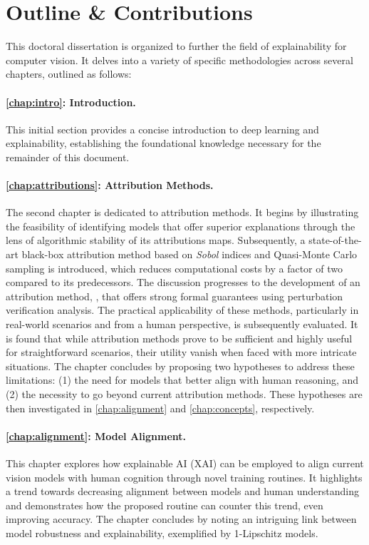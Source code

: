 \section{Outline \& Contributions}
\label{sec:intro:contrib}

This doctoral dissertation is organized to further the field of explainability for computer vision. It delves into a variety of specific methodologies across several chapters, outlined as follows:

\paragraph{\autoref{chap:intro}: Introduction.} This initial section provides a concise introduction to deep learning and explainability, establishing the foundational knowledge necessary for the remainder of this document.

\paragraph{\autoref{chap:attributions}: Attribution Methods.} The second chapter is dedicated to attribution methods. It begins by illustrating the feasibility of identifying models that offer superior explanations through the lens of algorithmic stability of its attributions maps. Subsequently, a state-of-the-art black-box attribution method based on \textit{Sobol} indices and Quasi-Monte Carlo sampling is introduced, which reduces computational costs by a factor of two compared to its predecessors. The discussion progresses to the development of an attribution method, \eva, that offers strong formal guarantees using perturbation verification analysis. The practical applicability of these methods, particularly in real-world scenarios and from a human perspective, is subsequently evaluated. It is found that while attribution methods prove to be sufficient and highly useful for straightforward scenarios, their utility vanish when faced with more intricate situations. The chapter concludes by proposing two hypotheses to address these limitations: (1) the need for models that better align with human reasoning, and (2) the necessity to go beyond current attribution methods. These hypotheses are then investigated in \autoref{chap:alignment} and \autoref{chap:concepts}, respectively.

\paragraph{\autoref{chap:alignment}: Model Alignment.} This chapter explores how explainable AI (XAI) can be employed to align current vision models with human cognition through novel training routines. It highlights a trend towards decreasing alignment between models and human understanding and demonstrates how the proposed routine can counter this trend, even improving accuracy. The chapter concludes by noting an intriguing link between model robustness and explainability, exemplified by 1-Lipschitz models.

